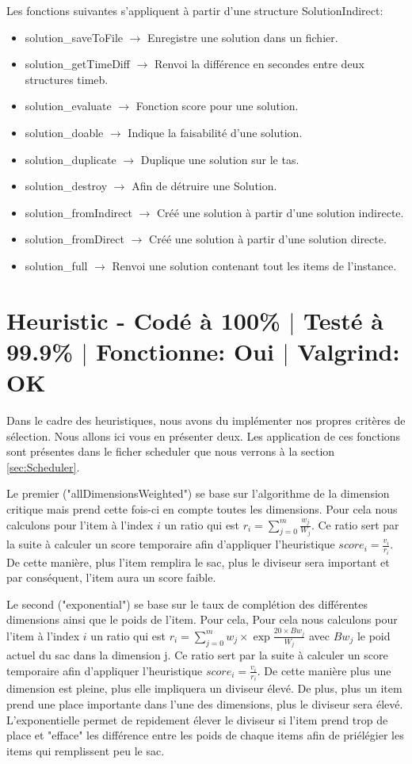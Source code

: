 \documentclass{EPUProjetPeiP}
\newcommand{\comp}[5]{
	\section[#1]{#1 {\small - Codé à #2\% $\vert$ Testé à #3\% $\vert$ Fonctionne: #4 $\vert$ Valgrind: #5}}
}
\begin{document}
Les fonctions suivantes s'appliquent à partir d'une structure SolutionIndirect:
\begin{itemize}
	\item solution\_saveToFile $\longrightarrow$ Enregistre une solution dans un fichier.
	\item solution\_getTimeDiff $\longrightarrow$ Renvoi la différence en secondes entre deux structures timeb.
	\item solution\_evaluate $\longrightarrow$ Fonction score pour une solution.
	\item solution\_doable $\longrightarrow$ Indique la faisabilité d'une solution.
	\item solution\_duplicate $\longrightarrow$ Duplique une solution sur le tas.
	\item solution\_destroy $\longrightarrow$ Afin de détruire une Solution.
	\item solution\_fromIndirect $\longrightarrow$ Créé une solution à partir d'une solution indirecte.
	\item solution\_fromDirect $\longrightarrow$ Créé une solution à partir d'une solution directe.
	\item solution\_full $\longrightarrow$ Renvoi une solution contenant tout les items de l'instance.
\end{itemize}

\comp{Heuristic \label{sec:Heuristic}}{100}{99.9}{Oui}{OK}
Dans le cadre des heuristiques, nous avons du implémenter nos propres critères de sélection. Nous allons ici vous en présenter deux. Les application de ces fonctions sont présentes dans le ficher scheduler que nous verrons à la section \ref{sec:Scheduler}.

Le premier ("allDimensionsWeighted") se base sur l'algorithme de la dimension critique mais prend cette fois-ci en compte toutes les dimensions. Pour cela nous calculons pour l'item à l'index $i$ un ratio qui est $r_i=\sum_{j=0}^m\frac{w_j}{W_j}$. Ce ratio sert par la suite à calculer un score temporaire afin d'appliquer l'heuristique $score_i=\frac{v_i}{r_i}$. De cette manière, plus l'item remplira le sac, plus le diviseur sera important et par conséquent, l'item aura un score faible.

Le second ("exponential") se base sur le taux de complétion des différentes dimensions ainsi que le poids de l'item. Pour cela, Pour cela nous calculons pour l'item à l'index $i$ un ratio qui est $r_i=\sum_{j=0}^mw_j\times\exp{\frac{20\times Bw_j}{W_j}}$ avec $Bw_j$ le poid actuel du sac dans la dimension j. Ce ratio sert par la suite à calculer un score temporaire afin d'appliquer l'heuristique $score_i=\frac{v_i}{r_i}$. De cette manière plus une dimension est pleine, plus elle impliquera un diviseur élevé. De plus, plus un item prend une place importante dans l'une des dimensions, plus le diviseur sera élevé. L'exponentielle permet de repidement élever le diviseur si l'item prend trop de place et "efface" les différence entre les poids de chaque items afin de priélégier les items qui remplissent peu le sac.
\end{document}
